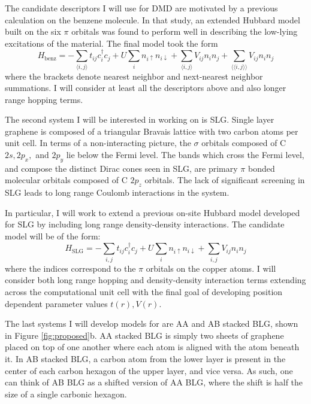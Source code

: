 \documentclass[12pt]{article}
\begin{document}
The candidate descriptors I will use for DMD are motivated by a previous calculation on the benzene molecule.
In that study, an extended Hubbard model built on the six $\pi$ orbitals was found to perform well in describing the low-lying excitations of the material.
The final model took the form 
\begin{equation}
H_\text{benz} = -\sum_{\langle i,j \rangle} t_{ij}c_i^\dagger c_j + U \sum_i n_{i\uparrow}n_{i\downarrow}  + \sum_{\langle i,j \rangle}V_{ij} n_i n_j + \sum_{\langle \langle i,j \rangle\rangle}V_{ij} n_i n_j
\label{Hbenz}
\end{equation}
where the brackets denote nearest neighbor and next-nearest neighbor summations.
I will consider at least all the descriptors above and also longer range hopping terms.

The second system I will be interested in working on is SLG.
Single layer graphene is composed of a triangular Bravais lattice with two carbon atoms per unit cell.
In terms of a non-interacting picture, the $\sigma$ orbitals composed of C $2s, 2p_x,$ and $2p_y$ lie below the Fermi level.
The bands which cross the Fermi level, and compose the distinct Dirac cones seen in SLG, are primary $\pi$ bonded molecular orbitals composed of C $2p_z$ orbitals.
The lack of significant screening in SLG leads to long range Coulomb interactions in the system.

In particular, I will work to extend a previous on-site Hubbard model developed for SLG by including long range density-density interactions.
The candidate model will be of the form:
\begin{equation}
H_\text{SLG} = -\sum_{i,j} t_{ij}c_i^\dagger c_j + U \sum_i n_{i\uparrow}n_{i\downarrow}  + \sum_{i,j} V_{ij} n_i n_j
\label{Hslg}
\end{equation}
where the indices correspond to the $\pi$ orbitals on the copper atoms.
I will consider both long range hopping and density-density interaction terms extending across the computational unit cell with the final goal of developing position dependent parameter values $t(r), V(r)$.

The last systems I will develop models for are AA and AB stacked BLG, shown in Figure \ref{fig:proposed}b.
AA stacked BLG is simply two sheets of graphene placed on top of one another where each atom is aligned with the atom beneath it.
In AB stacked BLG, a carbon atom from the lower layer is present in the center of each carbon hexagon of the upper layer, and vice versa.
As such, one can think of AB BLG as a shifted version of AA BLG, where the shift is half the size of a single carbonic hexagon.
\end{document}

